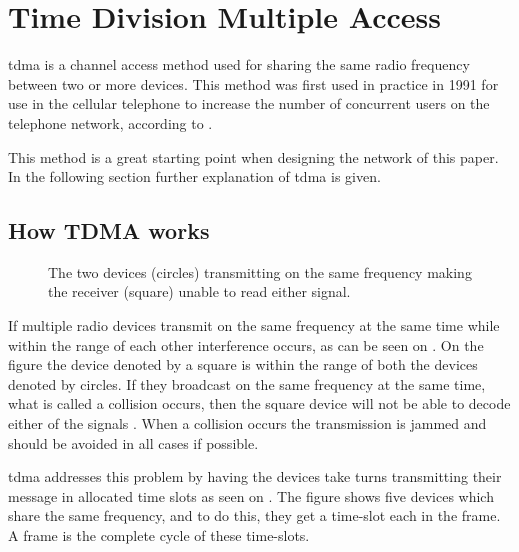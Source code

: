 \chapter{Time Division Multiple Access}\label{TDMA}

\gls{tdma} is a channel access method used for sharing the same radio frequency between two or more devices.
This method was first used in practice in 1991 for use in the cellular telephone to increase the number of concurrent users on the telephone network, according to \citet{networkencyclopedia2013time}.

This method is a great starting point when designing the network of this paper.
In the following section further explanation of \gls{tdma} is given.

\section{How TDMA works}

\begin{SCfigure}
    \vspace{-10pt}
    \centering
    \footnotesize
    \resizebox{0.5\linewidth}{!}{%
}
    \caption{The two devices (circles) transmitting on the same frequency making the receiver (square) unable to read either signal.}
    \label{fig:rangediagram}
    \vspace{-10pt}    
\end{SCfigure}

If multiple radio devices transmit on the same frequency at the same time while within the range of each other interference occurs, as can be seen on . 
On the figure the device denoted by a square is within the range of both the devices denoted by circles. 
If they broadcast on the same frequency at the same time, what is called a collision occurs, then the square device will not be able to decode either of the signals \cite{networkencyclopedia2013time, networkencyclopedia2013advanced}.
When a collision occurs the transmission is jammed and should be avoided in all cases if possible.


\gls{tdma} addresses this problem by having the devices take turns transmitting their message in allocated time slots as seen on .
The figure shows five devices which share the same frequency, and to do this, they get a time-slot each in the frame.
A frame is the complete cycle of these time-slots.


